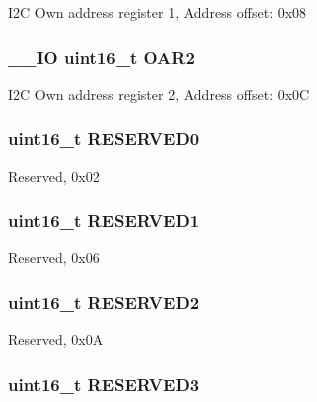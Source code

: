 I2\-C Own address register 1, Address offset\-: 0x08 \hypertarget{struct_i2_c___type_def_a692c0f6e38cde9ec1c3c50c36aa79817}{
\subsubsection[{O\-A\-R2}]{\setlength{\rightskip}{0pt plus 5cm}\-\_\-\-\_\-\-I\-O uint16\-\_\-t O\-A\-R2}}\label{struct_i2_c___type_def_a692c0f6e38cde9ec1c3c50c36aa79817}
I2\-C Own address register 2, Address offset\-: 0x0\-C \hypertarget{struct_i2_c___type_def_a149feba01f9c4a49570c6d88619f504f}{
\subsubsection[{R\-E\-S\-E\-R\-V\-E\-D0}]{\setlength{\rightskip}{0pt plus 5cm}uint16\-\_\-t R\-E\-S\-E\-R\-V\-E\-D0}}\label{struct_i2_c___type_def_a149feba01f9c4a49570c6d88619f504f}
Reserved, 0x02 \hypertarget{struct_i2_c___type_def_a8249a3955aace28d92109b391311eb30}{
\subsubsection[{R\-E\-S\-E\-R\-V\-E\-D1}]{\setlength{\rightskip}{0pt plus 5cm}uint16\-\_\-t R\-E\-S\-E\-R\-V\-E\-D1}}\label{struct_i2_c___type_def_a8249a3955aace28d92109b391311eb30}
Reserved, 0x06 \hypertarget{struct_i2_c___type_def_a5573848497a716a9947fd87487709feb}{
\subsubsection[{R\-E\-S\-E\-R\-V\-E\-D2}]{\setlength{\rightskip}{0pt plus 5cm}uint16\-\_\-t R\-E\-S\-E\-R\-V\-E\-D2}}\label{struct_i2_c___type_def_a5573848497a716a9947fd87487709feb}
Reserved, 0x0\-A \hypertarget{struct_i2_c___type_def_a6c3b31022e6f59b800e9f5cc2a89d54c}{
\subsubsection[{R\-E\-S\-E\-R\-V\-E\-D3}]{\setlength{\rightskip}{0pt plus 5cm}uint16\-\_\-t R\-E\-S\-E\-R\-V\-E\-D3}}\label{struct_i2_c___type_def_a6c3b31022e6f59b800e9f5cc2a89d54c}
